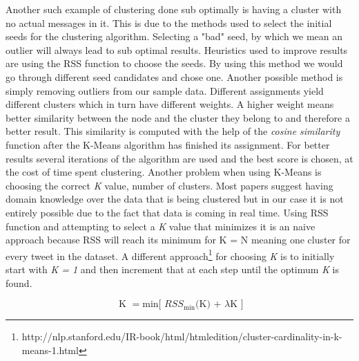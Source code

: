 \newline
Another such example of clustering done sub optimally is having a cluster with no actual messages in it. This is due to the methods used to select the initial seeds for the clustering algorithm. Selecting a "bad" seed, by which we mean an outlier will always lead to sub optimal results. Heuristics used to improve results are using the RSS function to choose the seeds. By using this method we would go through different seed candidates and chose one. Another possible method is simply removing outliers from our sample data.
\newline
Different assignments yield different clusters which in turn have different weights. A higher weight means better similarity between the node and the cluster they belong to and therefore a better result. This similarity is computed with the help of the \textit{cosine similarity} function after the K-Means algorithm has finished its assignment. For better results several iterations of the algorithm are used and the best score is chosen, at the cost of time spent clustering.
\newline
Another problem when using K-Means is choosing the correct \textit{K} value, number of clusters. Most papers suggest having domain knowledge over the data that is being clustered but in our case it is not entirely possible due to the fact that data is coming in real time. Using RSS function and attempting to select a \textit{K} value that minimizes it is an naive approach because RSS will reach its minimum for K = N meaning one cluster for every tweet in the dataset.
\newline
A different approach\footnote{http://nlp.stanford.edu/IR-book/html/htmledition/cluster-cardinality-in-k-means-1.html} for choosing \textit{K} is to initially start with \textit{K = 1} and then increment that at each step until the optimum \textit{K} is found.

\begin{equation}
\text{ K } = {{ \textrm{min[ ${RSS_\textrm{min}}$(K) + $\lambda$K ]} }}
\end{equation}


